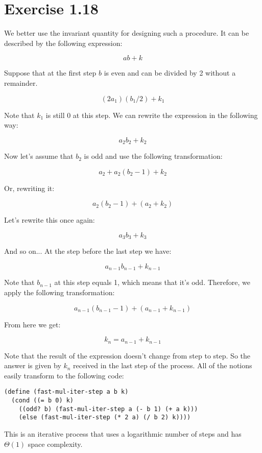 \section*{Exercise 1.18}

We better use the invariant quantity for designing such a procedure. It can be described by the following expression:

\[
ab + k
\]

Suppose that at the first step $b$ is even and can be divided by 2 without a remainder.

\[
(2a_1)(b_1 / 2) + k_1
\]

Note that $k_1$ is still 0 at this step. We can rewrite the expression in the following way:

\[
a_2 b_2 + k_2
\]

Now let's assume that $b_2$ is odd and use the following transformation:

\[
a_2 + a_2 (b_2 - 1) + k_2
\]

Or, rewriting it:

\[
a_2 (b_2 - 1) + (a_2 + k_2) 
\]

Let's rewrite this once again:

\[
a_3 b_3 + k_3
\]

And so on... At the step before the last step we have:

\[
a_{n-1} b_{n-1} + k_{n - 1}
\]

Note that $b_{n - 1}$ at this step equals 1, which means that it's odd. Therefore, we apply the following transformation:

\[
a_{n - 1}(b_{n - 1} - 1) + (a_{n-1} + k_{n - 1})
\]

From here we get:

\[
k_n = a_{n - 1} + k_{n - 1}
\]

Note that the result of the expression doesn't change from step to step. So the answer is given by $k_n$ received in the last step of the process. All of the notions easily transform to the following code:

\begin{verbatim}
(define (fast-mul-iter-step a b k)
  (cond ((= b 0) k)
	((odd? b) (fast-mul-iter-step a (- b 1) (+ a k)))
	(else (fast-mul-iter-step (* 2 a) (/ b 2) k))))
\end{verbatim}

This is an iterative process that uses a logarithmic number of steps and has $\Theta(1)$ space complexity.

